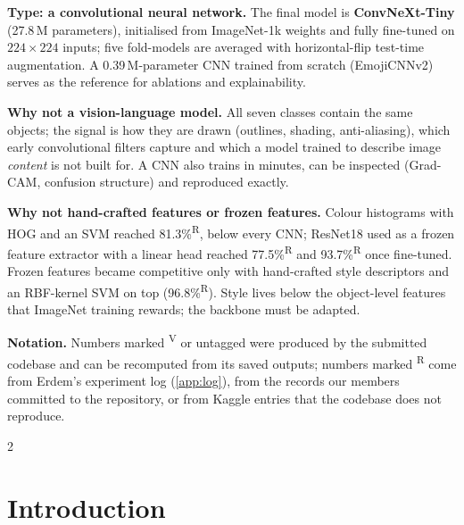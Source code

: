 \documentclass[11pt,a4paper]{article}
\newcommand{\ver}{\textsuperscript{\textcolor{verified}{\sffamily\scriptsize V}}}
\newcommand{\rep}{\textsuperscript{\textcolor{reported}{\sffamily\scriptsize R}}}
\newcommand{\pct}[1]{#1\%}
\begin{document}
\vspace{0.4em}
\begin{keybox}[title={Model chosen}]
\small
\textbf{Type: a convolutional neural network.} The final model is \textbf{ConvNeXt-Tiny} \cite{liu2022convnext} (27.8\,M parameters), initialised from ImageNet-1k weights \cite{deng2009imagenet,wightman2019timm} and fully fine-tuned on $224\times224$ inputs; five fold-models are averaged with horizontal-flip test-time augmentation. A 0.39\,M-parameter CNN trained from scratch (EmojiCNNv2) serves as the reference for ablations and explainability.

\textbf{Why not a vision-language model.} All seven classes contain the same objects; the signal is how they are drawn (outlines, shading, anti-aliasing), which early convolutional filters capture \cite{gatys2016style} and which a model trained to describe image \emph{content} is not built for. A CNN also trains in minutes, can be inspected (Grad-CAM, confusion structure) and reproduced exactly.

\textbf{Why not hand-crafted features or frozen features.} Colour histograms with HOG and an SVM reached \pct{81.3}\rep, below every CNN; ResNet18 used as a frozen feature extractor with a linear head reached \pct{77.5}\rep{} and \pct{93.7}\rep{} once fine-tuned. Frozen features became competitive only with hand-crafted style descriptors and an RBF-kernel SVM on top (\pct{96.8}\rep). Style lives below the object-level features that ImageNet training rewards; the backbone must be adapted.
\end{keybox}

{\small\color{ink2}\textbf{Notation.} Numbers marked \ver{} or untagged were produced by the submitted codebase and can be recomputed from its saved outputs; numbers marked \rep{} come from Erdem's experiment log (\cref{app:log}), from the records our members committed to the repository, or from Kaggle entries that the codebase does not reproduce.\par}

\clearpage
{\small\renewcommand{\contentsname}{\large Contents}\begin{multicols}{2}\tableofcontents\end{multicols}}
\vspace{0.6em}

\section{Introduction}
\label{sec:intro}
\end{document}
